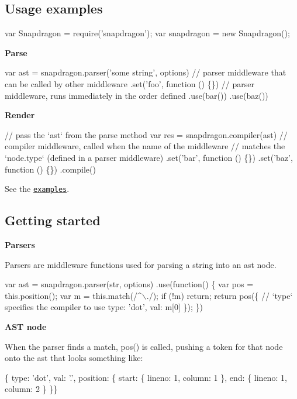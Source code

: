 \subsection*{Usage examples}


\begin{DoxyCode}
var Snapdragon = require('snapdragon');
var snapdragon = new Snapdragon();
\end{DoxyCode}


{\bfseries Parse}


\begin{DoxyCode}
var ast = snapdragon.parser('some string', options)
  // parser middleware that can be called by other middleware
  .set('foo', function () \{\})
  // parser middleware, runs immediately in the order defined
  .use(bar())
  .use(baz())
\end{DoxyCode}


{\bfseries Render}


\begin{DoxyCode}
// pass the `ast` from the parse method
var res = snapdragon.compiler(ast)
  // compiler middleware, called when the name of the middleware
  // matches the `node.type` (defined in a parser middleware)
  .set('bar', function () \{\})
  .set('baz', function () \{\})
  .compile()
\end{DoxyCode}


See the \href{./examples/}{\tt examples}.

\subsection*{Getting started}

{\bfseries Parsers}

Parsers are middleware functions used for parsing a string into an ast node.


\begin{DoxyCode}
var ast = snapdragon.parser(str, options)
  .use(function() \{
    var pos = this.position();
    var m = this.match(/^\(\backslash\)./);
    if (!m) return;
    return pos(\{
      // `type` specifies the compiler to use
      type: 'dot',
      val: m[0]
    \});
  \})
\end{DoxyCode}


{\bfseries A\+ST node}

When the parser finds a match, {\ttfamily pos()} is called, pushing a token for that node onto the ast that looks something like\+:


\begin{DoxyCode}
\{ type: 'dot',
  val: '.',
  position:
   \{ start: \{ lineno: 1, column: 1 \},
     end: \{ lineno: 1, column: 2 \} \}\}
\end{DoxyCode}


